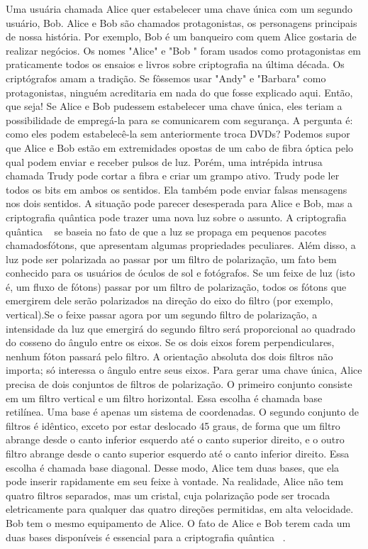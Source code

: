 Uma usuária chamada Alice quer estabelecer uma chave única com um segundo usuário, Bob. Alice
e Bob são chamados protagonistas, os personagens principais de nossa história. Por exemplo, Bob é um banqueiro com quem Alice gostaria de realizar negócios. Os nomes "Alice" e "Bob " foram usados como protagonistas em praticamente todos os ensaios e livros sobre criptografia na última década. Os criptógrafos amam a tradição. Se fôssemos usar "Andy" e "Barbara" como
protagonistas, ninguém acreditaria em nada do que fosse explicado aqui. Então, que seja!
Se Alice e Bob pudessem estabelecer uma chave única, eles teriam a possibilidade de empregá-la
para se comunicarem com segurança. A pergunta é: como eles podem estabelecê-la sem
anteriormente troca DVDs? Podemos supor que Alice e Bob estão em extremidades opostas de um
cabo de fibra óptica pelo qual podem enviar e receber pulsos de luz. Porém, uma intrépida intrusa chamada Trudy pode cortar a fibra e criar um grampo ativo. Trudy pode ler todos os bits em ambos os sentidos.
Ela também pode enviar falsas mensagens nos dois sentidos. A situação pode parecer desesperada para Alice e Bob, mas a criptografia quântica pode trazer uma nova luz sobre o assunto.
A criptografia quântica ~\cite{tanenbaum} se baseia no fato de que a luz se propaga em pequenos pacotes chamadosfótons, que apresentam algumas propriedades peculiares. Além disso, a luz pode ser polarizada ao passar por um filtro de polarização, um fato bem conhecido para os usuários de óculos de sol e fotógrafos. Se um feixe de luz (isto é, um fluxo de fótons) passar por um filtro de polarização, todos os fótons que emergirem dele serão polarizados na direção do eixo do filtro (por exemplo, vertical).Se o feixe passar agora por um segundo filtro de polarização, a intensidade da luz que emergirá do segundo filtro será proporcional ao quadrado do cosseno do ângulo entre os eixos. Se os dois eixos forem perpendiculares, nenhum fóton passará pelo filtro. A orientação absoluta dos dois filtros não importa; só interessa o ângulo entre seus eixos.
Para gerar uma chave única, Alice precisa de dois conjuntos de filtros de polarização. O primeiro conjunto consiste em um filtro vertical e um filtro horizontal. Essa escolha é chamada base retilínea. Uma base é apenas um sistema de coordenadas. O segundo conjunto de filtros é idêntico, exceto por estar deslocado 45 graus, de forma que um filtro abrange desde o canto inferior esquerdo até o canto superior direito, e o outro filtro abrange desde o canto superior esquerdo até o canto inferior direito. Essa escolha é chamada base diagonal. Desse modo, Alice tem duas bases, que ela pode inserir rapidamente em seu feixe à vontade. Na realidade, Alice não tem quatro filtros separados, mas um cristal, cuja polarização pode ser trocada eletricamente para qualquer das quatro direções permitidas, em alta velocidade. Bob tem o mesmo equipamento de Alice. O fato de Alice e Bob terem cada um duas bases disponíveis é essencial para a criptografia quântica ~\cite{tanenbaum}.
